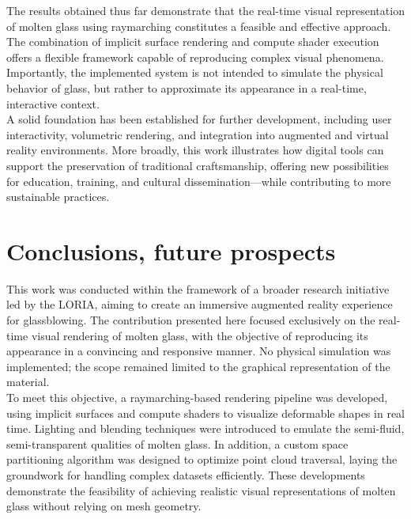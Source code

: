 \documentclass{rapportcs}
\begin{document}
        The results obtained thus far demonstrate that the real-time visual representation of molten glass using raymarching constitutes a feasible and effective approach. The combination of implicit surface rendering and compute shader execution offers a flexible framework capable of reproducing complex visual phenomena. Importantly, the implemented system is not intended to simulate the physical behavior of glass, but rather to approximate its appearance in a real-time, interactive context. \\
        
        A solid foundation has been established for further development, including user interactivity, volumetric rendering, and integration into augmented and virtual reality environments. More broadly, this work illustrates how digital tools can support the preservation of traditional craftsmanship, offering new possibilities for education, training, and cultural dissemination—while contributing to more sustainable practices.

\newpage

\section{Conclusions, future prospects}

    This work was conducted within the framework of a broader research initiative led by the LORIA, aiming to create an immersive augmented reality experience for glassblowing. The contribution presented here focused exclusively on the real-time visual rendering of molten glass, with the objective of reproducing its appearance in a convincing and responsive manner. No physical simulation was implemented; the scope remained limited to the graphical representation of the material. \\

    To meet this objective, a raymarching-based rendering pipeline was developed, using implicit surfaces and compute shaders to visualize deformable shapes in real time. Lighting and blending techniques were introduced to emulate the semi-fluid, semi-transparent qualities of molten glass. In addition, a custom space partitioning algorithm was designed to optimize point cloud traversal, laying the groundwork for handling complex datasets efficiently. These developments demonstrate the feasibility of achieving realistic visual representations of molten glass without relying on mesh geometry. \\
    
\end{document}
